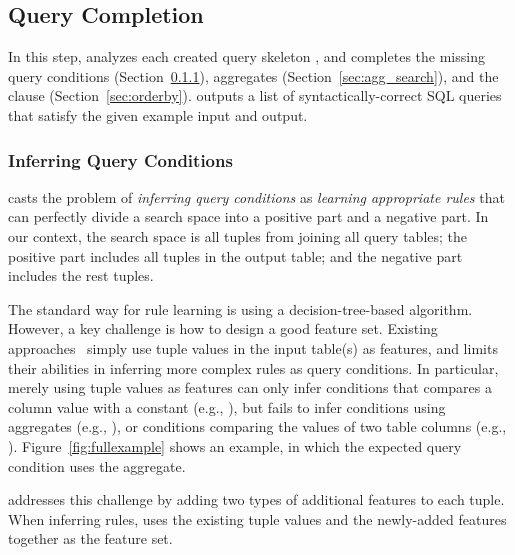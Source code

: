 \subsection{Query Completion}
\label{sec:completion}



In this step, \ourtool analyzes each created query skeleton
, and completes the missing query conditions (Section~\ref{sec:condition}),
aggregates (Section~\ref{sec:agg_search}), and
the  clause (Section~\ref{sec:orderby}).
\ourtool outputs a list of syntactically-correct SQL queries
that satisfy the given example input and output.



\subsubsection{Inferring Query Conditions}
\label{sec:condition}

\ourtool casts the problem of \textit{inferring query conditions} as
 \textit{learning appropriate rules} that can perfectly divide a search space
into a positive part and a negative part. In our context, the search space
is all tuples from joining all query tables; the positive part
includes all tuples in the output table; and the negative part includes the rest
tuples.

The standard way for rule learning is using a decision-tree-based
algorithm. However, a key challenge
is how to design a good feature set.
Existing approaches~\cite{Tran:2009} simply use
tuple values in the input table(s) as features, 
and limits their abilities in inferring more
complex rules as query conditions. In particular,
merely using tuple values as features can only infer
conditions that compares a column value with a constant
(e.g., ), but
fails to infer conditions using aggregates (e.g., ),
or conditions comparing the values of two table columns
(e.g., ).
Figure~\ref{fig:fullexample} shows an example, in
which the expected query condition uses the  aggregate.


\ourtool addresses this challenge by adding two types of
additional features to each tuple. When inferring rules, \ourtool
uses the existing tuple values and the newly-added features
together as the feature set.

